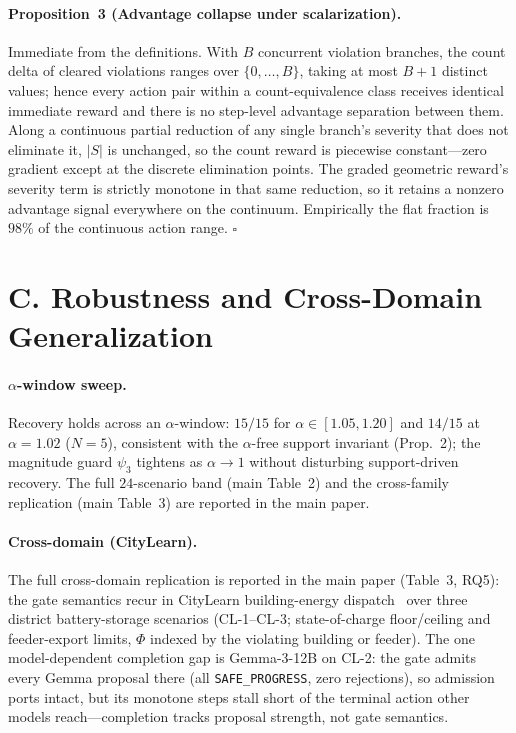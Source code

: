 \documentclass[letterpaper]{article} %
\newcommand{\psithree}{\psi_3}
\begin{document}
\paragraph{Proposition~3 (Advantage collapse under scalarization).}
Immediate from the definitions. With $B$ concurrent violation branches, the count delta of cleared violations ranges over $\{0,\dots,B\}$, taking at most $B{+}1$ distinct values; hence every action pair within a count-equivalence class receives identical immediate reward and there is no step-level advantage separation between them. Along a continuous partial reduction of any single branch's severity that does not eliminate it, $|S|$ is unchanged, so the count reward is piecewise constant---zero gradient except at the discrete elimination points. The graded geometric reward's severity term is strictly monotone in that same reduction, so it retains a nonzero advantage signal everywhere on the continuum. Empirically the flat fraction is $98\%$ of the continuous action range. $\square$

\section{C. Robustness and Cross-Domain Generalization}
\label{supp:gen}

\paragraph{$\alpha$-window sweep.}
Recovery holds across an $\alpha$-window: $15/15$ for $\alpha\in[1.05,1.20]$ and $14/15$ at $\alpha{=}1.02$ ($N{=}5$), consistent with the $\alpha$-free support invariant (Prop.~2); the magnitude guard $\psithree$ tightens as $\alpha\to1$ without disturbing support-driven recovery. The full $24$-scenario band (main Table~2) and the cross-family replication (main Table~3) are reported in the main paper.

\paragraph{Cross-domain (CityLearn).}
The full cross-domain replication is reported in the main paper (Table~3, RQ5): the gate semantics recur in CityLearn building-energy dispatch~\citep{citylearn} over three district battery-storage scenarios (CL-1--CL-3; state-of-charge floor/ceiling and feeder-export limits, $\Phi$ indexed by the violating building or feeder). The one model-dependent completion gap is Gemma-3-12B on CL-2: the gate admits every Gemma proposal there (all \texttt{SAFE\_PROGRESS}, zero rejections), so admission ports intact, but its monotone steps stall short of the terminal action other models reach---completion tracks proposal strength, not gate semantics.
\end{document}
